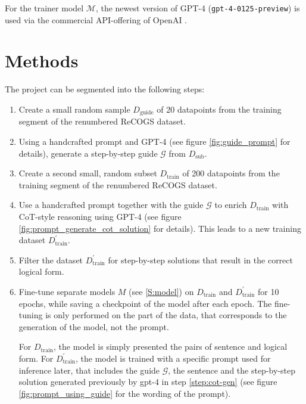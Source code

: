 \documentclass[11pt]{article}
\begin{document}
    For the trainer model $\mathcal{M}$, the newest version of GPT-4 (\texttt{gpt-4-0125-preview}) is used via the
    commercial API-offering of OpenAI \cite{openai_gpt-4_2024}.


    \section{Methods}\label{S:methods}

    The project can be segmented into the following steps:

    \begin{enumerate}
        \item Create a small random sample $D_\mathrm{guide}$ of 20 datapoints from the training segment of the renumbered ReCOGS dataset.

        \item\label{step:gpt4_guide} Using a handcrafted prompt and GPT-4 (see figure \ref{fig:guide_prompt} for details), generate a step-by-step guide $\mathcal{G}$ from $D_\mathrm{sub}$.

        \item Create a second small, random subset $D_\mathrm{train}$ of 200 datapoints from the training segment of the renumbered ReCOGS dataset.

        \item\label{step:cot-gen} Use a handcrafted prompt together with the guide $\mathcal{G}$ to enrich $D_\mathrm{train}$
        with CoT-style reasoning using GPT-4 (see figure \ref{fig:prompt_generate_cot_solution} for details).
        This leads to a new training dataset $D_\mathrm{train}^\prime$.

        \item Filter the dataset $D_\mathrm{train}^\prime$ for step-by-step solutions that result in the correct logical form.

        \item Fine-tune separate models $M$ (see \ref{S:model}) on $D_\mathrm{train}$ and $D_\mathrm{train}^\prime$ for 10 epochs, while
        saving a checkpoint of the model after each epoch.
        The fine-tuning is only performed on the part of the data, that corresponds to the generation of the model, not the prompt.

        For $D_\mathrm{train}$, the model is simply presented the pairs of sentence and logical form.
        For $D_\mathrm{train}^\prime$, the model is trained with a specific prompt used for inference later, that includes the
        guide $\mathcal{G}$, the sentence and the step-by-step solution generated previously by gpt-4 in step \ref{step:cot-gen}
        (see figure \ref{fig:prompt_using_guide} for the wording of the prompt).


\end{enumerate}
\end{document}
